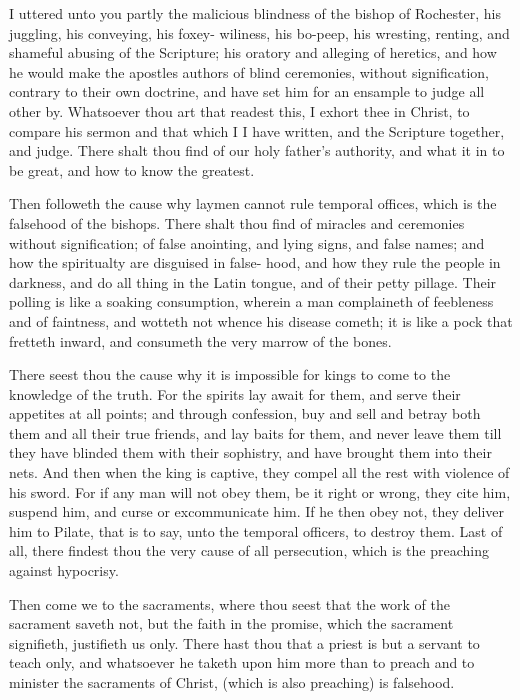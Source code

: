 I uttered unto you partly the malicious blindness of the 
bishop of Rochester, his juggling, his conveying, his foxey- 
wiliness, his bo-peep, his wresting, renting, and shameful 
abusing of the Scripture; his oratory and alleging of heretics,
and how he would make the apostles authors of blind 
ceremonies, without signification, contrary to their own 
doctrine, and have set him for an ensample to judge all 
other by. Whatsoever thou art that readest this, I exhort 
thee in Christ, to compare his sermon and that which I 
I have written, and the Scripture together, and judge. 
There shalt thou find of our holy father's authority, and 
what it in to be great, and how to know the greatest. 

Then followeth the cause why laymen cannot rule 
temporal offices, which is the falsehood of the bishops. 
There shalt thou find of miracles and ceremonies without 
signification; of false anointing, and lying signs, and false 
names; and how the spiritualty are disguised in false- 
hood, and how they rule the people in darkness, and do 
all thing in the Latin tongue, and of their petty pillage. 
Their polling is like a soaking consumption, wherein a man 
complaineth of feebleness and of faintness, and wotteth not 
whence his disease cometh; it is like a pock that fretteth 
inward, and consumeth the very marrow of the bones. 

There seest thou the cause why it is impossible for 
kings to come to the knowledge of the truth. For the 
spirits lay await for them, and serve their appetites at all 
points; and through confession, buy and sell and betray 
both them and all their true friends, and lay baits for
them, and never leave them till they have blinded them 
with their sophistry, and have brought them into their 
nets. And then when the king is captive, they compel 
all the rest with violence of his sword. For if any man 
will not obey them, be it right or wrong, they cite him, 
suspend him, and curse or excommunicate him. If he 
then obey not, they deliver him to Pilate, that is to say, 
unto the temporal officers, to destroy them. Last of all, 
there findest thou the very cause of all persecution, which 
is the preaching against hypocrisy. 

Then come we to the sacraments, where thou seest 
that the work of the sacrament saveth not, but the faith 
in the promise, which the sacrament signifieth, justifieth 
us only. There hast thou that a priest is but a servant to 
teach only, and whatsoever he taketh upon him more than 
to preach and to minister the sacraments of Christ, (which 
is also preaching) is falsehood. 

